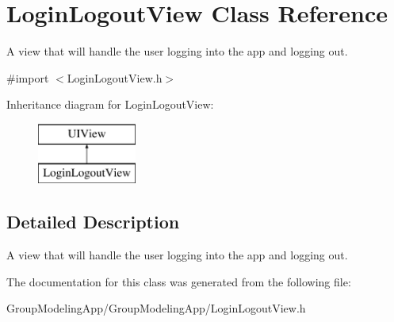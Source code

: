 \hypertarget{interface_login_logout_view}{\section{Login\-Logout\-View Class Reference}
\label{interface_login_logout_view}
}


A view that will handle the user logging into the app and logging out.  




{\ttfamily \#import $<$Login\-Logout\-View.\-h$>$}

Inheritance diagram for Login\-Logout\-View\-:\begin{figure}[H]
\begin{center}
\leavevmode
\includegraphics[height=2.000000cm]{interface_login_logout_view}
\end{center}
\end{figure}


\subsection{Detailed Description}
A view that will handle the user logging into the app and logging out. 

The documentation for this class was generated from the following file\-:\begin{DoxyCompactItemize}
\item 
Group\-Modeling\-App/\-Group\-Modeling\-App/Login\-Logout\-View.\-h\end{DoxyCompactItemize}
